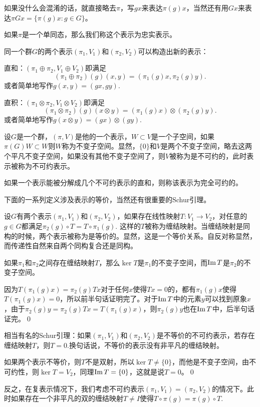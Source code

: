 如果没什么会混淆的话，就直接略去$\pi$，写$gx$来表达$\pi(g)x$，当然还有用$Gx$来表达$\pi{G}x=\{\pi(g)x:g\in G\}$。

如果$\pi$是一个单同态，那么我们称这个表示为忠实表示。

\para 同一个群$G$的两个表示$(\pi_1,V_1)$和$(\pi_2,V_2)$可以构造出新的表示：

 直和：$(\pi_1\oplus \pi_2,V_1\oplus V_2)$即满足
\[
	(\pi_1\oplus \pi_2)(g)(x,y)=(\pi_1(g)x,\pi_2(g)y).
\]
或者简单地写作$g(x,y)=(gx,gy)$.

 直积：$(\pi_1\otimes \pi_2,V_1\otimes V_2)$即满足
\[
	(\pi_1\otimes \pi_2)(g)(x\otimes y)=(\pi_1(g)x)\otimes (\pi_2(g)y).
\]
或者简单地写作$g(x\otimes y)=(gx)\otimes(gy)$.

\para 设$G$是一个群，$(\pi,V)$是他的一个表示，$W\subset V$是一个子空间，如果$\pi(G)W\subset W$则$W$称为不变子空间。显然，$\{0\}$和$V$是两个不变子空间，略去这两个平凡不变子空间，如果没有其他不变子空间了，则$V$被称为是不可约的，此时表示被称为不可约表示。

\para 如果一个表示能被分解成几个不可约表示的直和，则称该表示为完全可约的。

下面的一系列定义涉及表示的等价，当然还有很重要的Schur引理。

\para 设$G$有两个表示$(\pi_1,V_1)$和$(\pi_2,V_2)$，如果存在线性映射$T:V_1\to V_2$，对任意的$g\in G$都满足$\pi_2(g)\circ T=T\circ \pi_1(g)$. 这样的$T$被称为缠结映射。当缠结映射是同构的时候，两个表示被称为是等价的。显然，这是一个等价关系。自反对称显然，而传递性自然来自两个同构复合还是同构。

\lem 如果$\pi_1$和$\pi_2$之间存在缠结映射$T$，那么$\ker T$是$\pi_1$的不变子空间，而$\operatorname{Im} T$是$\pi_2$的不变子空间。

\proof 因为$T(\pi_1(g)x)=\pi_2(g)Tx$对于任何$x$使得$Tx=0$的，都有$\pi_1(g)x$使得$T(\pi_1(g)x)=0$，所以前半句话证明完了。对于$\operatorname{Im} T$中的元素$y$可以找到原象$x$，由于$\pi_2(g)y=\pi_2(g)Tx=T(\pi_1(g)x)$，则$\pi_2(g)y$也在$\operatorname{Im} T$中，后半句话证完。\qed

\lem 相当有名的Schur引理：如果$(\pi_1,V_1)$和$(\pi_2,V_2)$是不等价的不可约表示，若存在缠结映射$T$，则$T=0$.换句话说，不等价的表示没有非平凡的缠结映射。

\proof 如果两个表示不等价，则$T$不是双射，所以$\ker T\neq \{0\}$，而他是不变子空间，由不可约性，则$\ker T= V_2$，同理$\operatorname{Im}  T= \{0\}$，这就是说$T=0$。\qed

\para 反之，在复表示情况下，我们考虑不可约表示$(\pi_1,V_1)=(\pi_2,V_2)$的情况下。此时如果存在一个非平凡的双的缠结映射$T\neq I$使得$T\circ \pi(g)=\pi(g)\circ T$.

